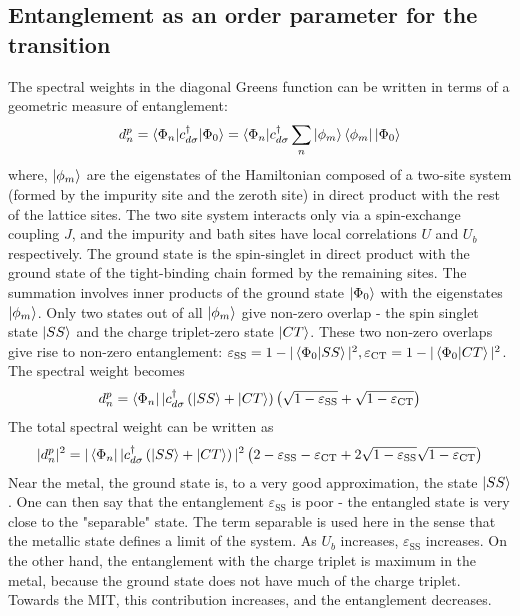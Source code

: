 \documentclass{report}
\numberwithin{equation}{section}
\begin{document}
\subsection{Entanglement as an order parameter for the transition}
The spectral weights in the diagonal Greens function can be written in terms of a geometric measure of entanglement:
\begin{equation}\begin{aligned}
	d_n^p = \braket{\Phi_n | c^\dagger_{d\sigma} | \Phi_0} = \braket{\Phi_n | c^\dagger_{d\sigma} \sum_n \ket{\phi_m} \bra{\phi_m} | \Phi_0}
\end{aligned}\end{equation}
where, \(\ket{\phi_m}\) are the eigenstates of the Hamiltonian composed of a two-site system (formed by the impurity site and the zeroth site) in direct product with the rest of the lattice sites. The two site system interacts only via a spin-exchange coupling \(J\), and the impurity and bath sites have local correlations \(U\) and \(U_b\) respectively. The ground state is the spin-singlet in direct product with the ground state of the tight-binding chain formed by the remaining sites. The summation involves inner products of the ground state \(\ket{\Phi_0}\) with the eigenstates \(\ket{\phi_m}\). Only two states out of all \(\ket{\phi_m}\) give non-zero overlap - the spin singlet state \(\ket{SS}\) and the charge triplet-zero state \(\ket{CT}\). These two non-zero overlaps give rise to non-zero entanglement: \(\varepsilon_\text{SS} = 1 - |\braket{\Phi_0 | SS}|^2, \varepsilon_\text{CT} = 1 - |\braket{\Phi_0 | CT}|^2\). The spectral weight becomes
\begin{equation}\begin{aligned}
	d_n^p = \bra{\Phi_n} | c^\dagger_{d\sigma} \left(\ket{SS} + \ket{CT} \right) \left(\sqrt{1 - \varepsilon_\text{SS}} + \sqrt{1 - \varepsilon_\text{CT}}\right)
\end{aligned}\end{equation}
The total spectral weight can be written as
\begin{equation}\begin{aligned}
	|d_n^p|^2 = |\bra{\Phi_n} | c^\dagger_{d\sigma} \left(\ket{SS} + \ket{CT} \right)|^2 \left(2 - \varepsilon_\text{SS} - \varepsilon_\text{CT} + 2\sqrt{1 - \varepsilon_\text{SS}}\sqrt{1 - \varepsilon_\text{CT}}\right)
\end{aligned}\end{equation}
Near the metal, the ground state is, to a very good approximation, the state \(\ket{SS}\). One can then say that the entanglement \(\varepsilon_\text{SS}\) is poor - the entangled state is very close to the "separable" state. The term separable is used here in the sense that the metallic state defines a limit of the system. As \(U_b\) increases, \(\varepsilon_\text{SS}\) increases. On the other hand, the entanglement with the charge triplet is maximum in the metal, because the ground state does not have much of the charge triplet. Towards the MIT, this contribution increases, and the entanglement decreases.
\end{document}
